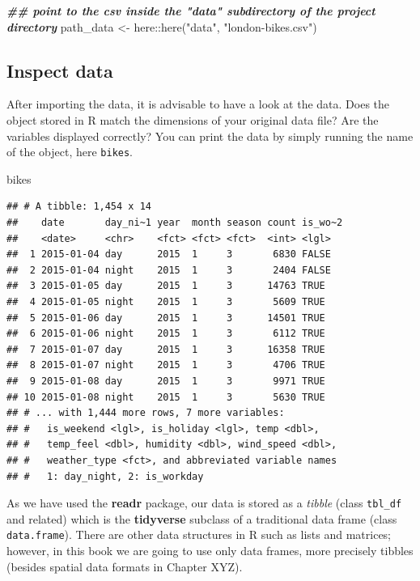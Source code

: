 \documentclass[
]{krantz}
\makeatletter
\newenvironment{Shaded}{\begin{snugshade}}{\end{snugshade}}
\newcommand{\DocumentationTok}[1]{\textcolor[rgb]{0.37,0.37,0.37}{\textbf{\textit{#1}}}}
\newcommand{\FunctionTok}[1]{\textcolor[rgb]{0,0,0}{#1}}
\newcommand{\NormalTok}[1]{#1}
\newcommand{\OtherTok}[1]{\textcolor[rgb]{0.37,0.37,0.37}{#1}}
\newcommand{\SpecialCharTok}[1]{\textcolor[rgb]{0,0,0}{#1}}
\newcommand{\StringTok}[1]{\textcolor[rgb]{0.5,0.5,0.5}{#1}}
\newenvironment{kframe}{%
\medskip{}
\setlength{\fboxsep}{.8em}
 \def\at@end@of@kframe{}%
 \ifinner\ifhmode%
  \def\at@end@of@kframe{\end{minipage}}%
  \begin{minipage}{\columnwidth}%
 \fi\fi%
 \def\FrameCommand##1{\hskip\@totalleftmargin \hskip-\fboxsep
 \colorbox{shadecolor}{##1}\hskip-\fboxsep
     \hskip-\linewidth \hskip-\@totalleftmargin \hskip\columnwidth}%
 \MakeFramed {\advance\hsize-\width
   \@totalleftmargin\z@ \linewidth\hsize
   \@setminipage}}%
 {\par\unskip\endMakeFramed%
 \at@end@of@kframe}
\renewenvironment{Shaded}{\begin{kframe}}{\end{kframe}}
\makeatother
\begin{document}
\begin{Shaded}
\begin{Highlighting}[]
\DocumentationTok{\#\# point to the csv inside the "data" subdirectory of the project directory}
\NormalTok{path\_data }\OtherTok{\textless{}{-}}\NormalTok{ here}\SpecialCharTok{::}\FunctionTok{here}\NormalTok{(}\StringTok{"data"}\NormalTok{, }\StringTok{"london{-}bikes.csv"}\NormalTok{) }
\end{Highlighting}
\end{Shaded}

\hypertarget{inspect}{%
\subsection{Inspect data}\label{inspect}}

After importing the data, it is advisable to have a look at the data. Does the object stored in R match the dimensions of your original data file? Are the variables displayed correctly? You can print the data by simply running the name of the object, here \texttt{bikes}.

\begin{Shaded}
\begin{Highlighting}[]
\NormalTok{bikes}
\end{Highlighting}
\end{Shaded}

\begin{verbatim}
## # A tibble: 1,454 x 14
##    date       day_ni~1 year  month season count is_wo~2
##    <date>     <chr>    <fct> <fct> <fct>  <int> <lgl>  
##  1 2015-01-04 day      2015  1     3       6830 FALSE  
##  2 2015-01-04 night    2015  1     3       2404 FALSE  
##  3 2015-01-05 day      2015  1     3      14763 TRUE   
##  4 2015-01-05 night    2015  1     3       5609 TRUE   
##  5 2015-01-06 day      2015  1     3      14501 TRUE   
##  6 2015-01-06 night    2015  1     3       6112 TRUE   
##  7 2015-01-07 day      2015  1     3      16358 TRUE   
##  8 2015-01-07 night    2015  1     3       4706 TRUE   
##  9 2015-01-08 day      2015  1     3       9971 TRUE   
## 10 2015-01-08 night    2015  1     3       5630 TRUE   
## # ... with 1,444 more rows, 7 more variables:
## #   is_weekend <lgl>, is_holiday <lgl>, temp <dbl>,
## #   temp_feel <dbl>, humidity <dbl>, wind_speed <dbl>,
## #   weather_type <fct>, and abbreviated variable names
## #   1: day_night, 2: is_workday
\end{verbatim}

As we have used the \textbf{readr} package, our data is stored as a \emph{tibble} (class \texttt{tbl\_df} and related) which is the \textbf{tidyverse} subclass of a traditional data frame (class \texttt{data.frame}). There are other data structures in R such as lists and matrices; however, in this book we are going to use only data frames, more precisely tibbles (besides spatial data formats in Chapter XYZ).
\end{document}
